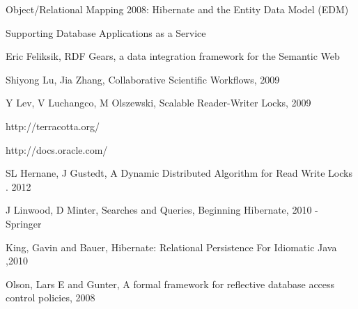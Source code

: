 \begin{thebibliography}{99}

 Object/Relational Mapping 2008: Hibernate and the Entity Data Model (EDM)

 Supporting Database Applications as a Service

 Eric Feliksik, RDF Gears, a data integration framework for the Semantic Web

 Shiyong Lu, Jia Zhang, Collaborative Scientific Workflows, 2009

 Y Lev, V Luchangco, M Olszewski, Scalable Reader-Writer Locks, 2009

 http://terracotta.org/

 http://docs.oracle.com/

 SL Hernane, J Gustedt, A Dynamic Distributed Algorithm for Read Write Locks . 2012

 J Linwood, D Minter, Searches and Queries, Beginning Hibernate, 2010 - Springer

 King, Gavin and Bauer, Hibernate: Relational Persistence For Idiomatic Java ,2010

 Olson, Lars E and Gunter, A formal framework for reflective database access control policies, 2008

\end{thebibliography}
